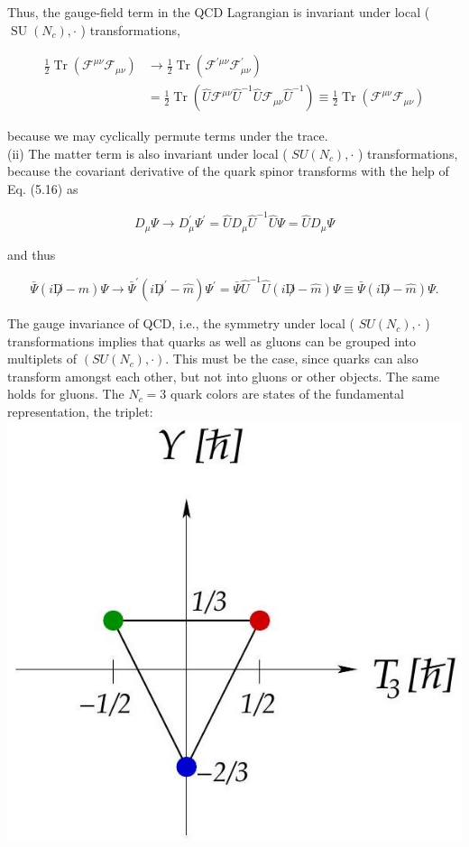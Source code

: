 \documentclass[10pt, letterpaper]{article}
\begin{document}
Thus, the gauge-field term in the QCD Lagrangian is invariant under local ( $\operatorname{SU}\left(N_{c}\right), \cdot$ ) transformations,

$$
\begin{aligned}
\frac{1}{2} \operatorname{Tr}\left(\mathcal{F}^{\mu \nu} \mathcal{F}_{\mu \nu}\right) & \longrightarrow \frac{1}{2} \operatorname{Tr}\left(\mathcal{F}^{\prime \mu \nu} \mathcal{F}_{\mu \nu}^{\prime}\right) \\
& =\frac{1}{2} \operatorname{Tr}\left(\hat{U} \mathcal{F}^{\mu \nu} \hat{U}^{-1} \hat{U} \mathcal{F}_{\mu \nu} \hat{U}^{-1}\right) \equiv \frac{1}{2} \operatorname{Tr}\left(\mathcal{F}^{\mu \nu} \mathcal{F}_{\mu \nu}\right)
\end{aligned}
$$

because we may cyclically permute terms under the trace.\\
(ii) The matter term is also invariant under local ( $S U\left(N_{c}\right), \cdot$ ) transformations, because the covariant derivative of the quark spinor transforms with the help of Eq. (5.16) as

$$
D_{\mu} \Psi \longrightarrow D_{\mu}^{\prime} \Psi^{\prime}=\hat{U} D_{\mu} \hat{U}^{-1} \hat{U} \Psi=\hat{U} D_{\mu} \Psi
$$

and thus

$$
\bar{\Psi}(i \not D-\hat{m}) \Psi \longrightarrow \bar{\Psi}^{\prime}\left(i \not D^{\prime}-\hat{m}\right) \Psi^{\prime}=\bar{\Psi} \hat{U}^{-1} \hat{U}(i \not D-\hat{m}) \Psi \equiv \bar{\Psi}(i \not D-\hat{m}) \Psi .
$$

The gauge invariance of QCD, i.e., the symmetry under local ( $S U\left(N_{c}\right), \cdot$ ) transformations implies that quarks as well as gluons can be grouped into multiplets of $\left(S U\left(N_{c}\right), \cdot\right)$. This must be the case, since quarks can also transform amongst each other, but not into gluons or other objects. The same holds for gluons. The $N_{c}=3$ quark colors are states of the fundamental representation, the triplet:\\
\includegraphics[scale=0.3, center]{2025_05_20_8618f55a41bfe980b4b2g-61}
\end{document}
